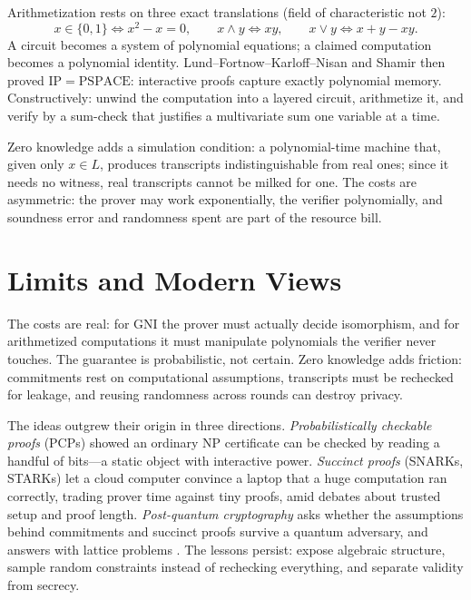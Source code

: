 Arithmetization rests on three exact translations (field of characteristic not $2$):
\[
x\in\{0,1\} \Longleftrightarrow x^2-x=0,\qquad
x\wedge y \Longleftrightarrow xy,\qquad
x\vee y \Longleftrightarrow x+y-xy.
\]
A circuit becomes a system of polynomial equations; a claimed computation becomes a polynomial identity. Lund--Fortnow--Karloff--Nisan and Shamir then proved $\mathrm{IP}=\mathrm{PSPACE}$: interactive proofs capture exactly polynomial memory. Constructively: unwind the computation into a layered circuit, arithmetize it, and verify by a sum-check that justifies a multivariate sum one variable at a time.

Zero knowledge adds a simulation condition: a polynomial-time machine that, given only $x\in L$, produces transcripts indistinguishable from real ones; since it needs no witness, real transcripts cannot be milked for one. The costs are asymmetric: the prover may work exponentially, the verifier polynomially, and soundness error and randomness spent are part of the resource bill.

\section{Limits and Modern Views}
The costs are real: for GNI the prover must actually decide isomorphism, and for arithmetized computations it must manipulate polynomials the verifier never touches. The guarantee is probabilistic, not certain. Zero knowledge adds friction: commitments rest on computational assumptions, transcripts must be rechecked for leakage, and reusing randomness across rounds can destroy privacy.

The ideas outgrew their origin in three directions. \emph{Probabilistically checkable proofs} (PCPs) showed an ordinary NP certificate can be checked by reading a handful of bits---a static object with interactive power. \emph{Succinct proofs} (SNARKs, STARKs) let a cloud computer convince a laptop that a huge computation ran correctly, trading prover time against tiny proofs, amid debates about trusted setup and proof length. \emph{Post-quantum cryptography} asks whether the assumptions behind commitments and succinct proofs survive a quantum adversary, and answers with lattice problems \cite{wigderson-interactive,wigderson-zk}. The lessons persist: expose algebraic structure, sample random constraints instead of rechecking everything, and separate validity from secrecy.

